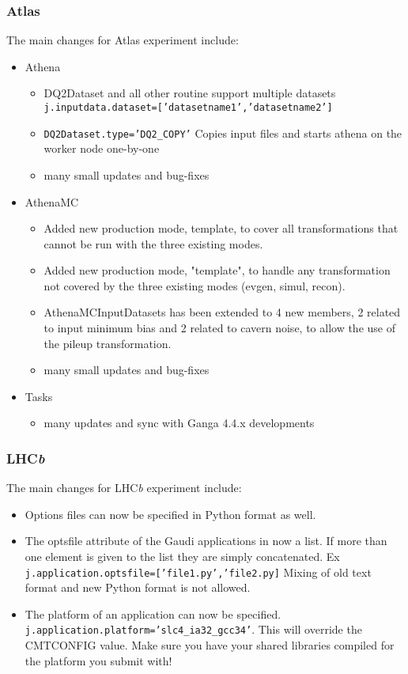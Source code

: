 \documentclass{howto}
\def\lhcb {LHC{\em b\/}\xspace}
\def\Atlas {Atlas\xspace}
\begin{document}
\subsubsection{\Atlas}
The main changes for \Atlas experiment include:
\begin{itemize}
\item Athena
\begin{itemize}
\item DQ2Dataset and all other routine support multiple datasets
\texttt{j.inputdata.dataset=['datasetname1','datasetname2']}
\item \texttt{DQ2Dataset.type='DQ2_COPY'} Copies input files and starts athena on the worker node one-by-one
\item many small updates and bug-fixes
\end{itemize}

\item AthenaMC
\begin{itemize}
\item Added new production mode, template, to cover all transformations that
  cannot be run with the three existing modes.
\item Added new production mode, "template", to handle any transformation
  not covered by the three existing modes (evgen, simul, recon).
\item AthenaMCInputDatasets has been extended to 4 new members, 2 related to
  input minimum bias and 2 related to cavern noise, to allow the use of
  the pileup transformation.
\item many small updates and bug-fixes
\end{itemize}
\item Tasks
\begin{itemize}
\item many updates and sync with Ganga 4.4.x developments
\end{itemize}
\end{itemize}

\subsubsection{\lhcb}

The main changes for \lhcb experiment include:
\begin{itemize}
\item Options files can now be specified in Python format as well.
\item The optsfile attribute of the Gaudi applications in now a list.
If more than one element is given to the list they are simply
concatenated. Ex \texttt{j.application.optsfile=['file1.py','file2.py]}
Mixing of old text format and new Python format is not allowed.
\item The platform of an application can now be specified.
\texttt{j.application.platform='slc4_ia32_gcc34'}. This will override the
CMTCONFIG value. Make sure you have your shared libraries
compiled for the platform you submit with!
\end{itemize}
\end{document}

